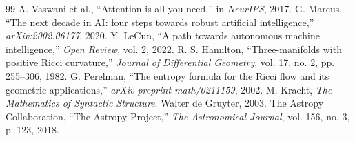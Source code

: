\documentclass[12pt, a4paper]{article}
\begin{document}
\begin{thebibliography}{99}
 A. Vaswani et al., ``Attention is all you need,'' in \textit{NeurIPS}, 2017.
 G. Marcus, ``The next decade in AI: four steps towards robust artificial intelligence,'' \textit{arXiv:2002.06177}, 2020.
 Y. LeCun, ``A path towards autonomous machine intelligence,'' \textit{Open Review}, vol. 2, 2022.
 R. S. Hamilton, ``Three-manifolds with positive Ricci curvature,'' \textit{Journal of Differential Geometry}, vol. 17, no. 2, pp. 255--306, 1982.
 G. Perelman, ``The entropy formula for the Ricci flow and its geometric applications,'' \textit{arXiv preprint math/0211159}, 2002.
 M. Kracht, \textit{The Mathematics of Syntactic Structure}. Walter de Gruyter, 2003.
 The Astropy Collaboration, ``The Astropy Project,'' \textit{The Astronomical Journal}, vol. 156, no. 3, p. 123, 2018.
\end{thebibliography}
\end{document}
